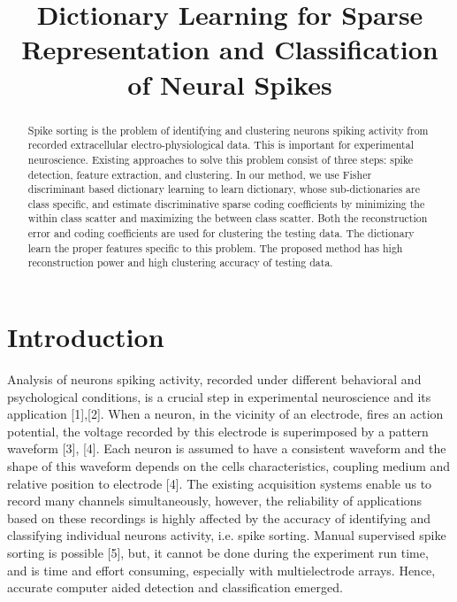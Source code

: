 \documentclass[conference]{IEEEtran}
\begin{document}
\title{Dictionary Learning for Sparse Representation and Classification of Neural Spikes}
\author{
}


\maketitle
	
	\begin{abstract}
		Spike sorting is the problem of identifying and
		clustering neurons spiking activity from recorded extracellular
		electro-physiological data. This is important for experimental
		neuroscience. Existing approaches to solve this problem consist of
		three steps: spike detection, feature extraction, and clustering. In
		our method, we use Fisher discriminant based dictionary learning
		to learn dictionary, whose sub-dictionaries are class specific, and
		estimate discriminative sparse coding coefficients by minimizing
		the within class scatter and maximizing the between class scatter.
		Both the reconstruction error and coding coefficients are used
		for clustering the testing data. The dictionary learn the proper
		features specific to this problem. The proposed method has high
		reconstruction power and high clustering accuracy of testing
		data.
	\end{abstract}
	
	\section{Introduction}
	Analysis of neurons spiking activity, recorded under different behavioral and psychological conditions, is a crucial step in experimental neuroscience and its application [1],[2]. When a neuron, in the vicinity of an electrode, fires an action potential, the voltage recorded by this electrode is superimposed by a pattern waveform [3], [4]. Each neuron is assumed to have a consistent waveform and the shape of this waveform depends on the cells characteristics, coupling medium and relative position to electrode [4]. The existing acquisition systems enable us to record many channels simultaneously, however, the reliability of applications based on these recordings is highly affected by the accuracy of identifying and classifying individual neurons activity, i.e. spike sorting. Manual supervised spike sorting is possible [5], but, it cannot be done during the experiment run time, and is time and effort consuming, especially with multielectrode arrays. Hence, accurate computer aided detection and classification emerged.
	
\end{document}
